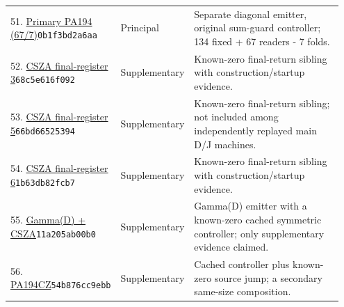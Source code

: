 \begin{longtable}{@{}p{0.27\linewidth}p{0.13\linewidth}p{0.55\linewidth}@{}}
51. \href{https://github.com/VladimirReshetnikov/ProveIt/blob/32d0d8b7d93a63ad4106c18cdb29b37927acdad2/Computability/BusyBeaver/Research/PA/docs/pa194_conpa_2026-11-13/construction/tables/pa194.tm}{Primary PA194 (67/7)}\newline\texttt{0b1f3bd2a6aa} & Principal & Separate diagonal emitter, original sum-guard controller; 134 fixed + 67 readers - 7 folds.\\[5pt]
52. \href{https://github.com/VladimirReshetnikov/ProveIt/blob/32d0d8b7d93a63ad4106c18cdb29b37927acdad2/Computability/BusyBeaver/Research/PA/docs/pa194j_pa194d_conpa_2026-11-13/research/sibling_tables/final_register_3/pa194CSZ_A3.tm}{CSZA final-register 3}\newline\texttt{68c5e616f092} & Supplementary & Known-zero final-return sibling with construction/startup evidence.\\[5pt]
53. \href{https://github.com/VladimirReshetnikov/ProveIt/blob/32d0d8b7d93a63ad4106c18cdb29b37927acdad2/Computability/BusyBeaver/Research/PA/docs/pa194j_pa194d_conpa_2026-11-13/research/sibling_tables/final_register_5/pa194CSZ_A5.tm}{CSZA final-register 5}\newline\texttt{66bd66525394} & Supplementary & Known-zero final-return sibling; not included among independently replayed main D/J machines.\\[5pt]
54. \href{https://github.com/VladimirReshetnikov/ProveIt/blob/32d0d8b7d93a63ad4106c18cdb29b37927acdad2/Computability/BusyBeaver/Research/PA/docs/pa194j_pa194d_conpa_2026-11-13/research/sibling_tables/final_register_6/pa194CSZ_A6.tm}{CSZA final-register 6}\newline\texttt{1b63db82fcb7} & Supplementary & Known-zero final-return sibling with construction/startup evidence.\\[5pt]
55. \href{https://github.com/VladimirReshetnikov/ProveIt/blob/32d0d8b7d93a63ad4106c18cdb29b37927acdad2/Computability/BusyBeaver/Research/PA/docs/pa194j_pa194d_conpa_2026-11-13/research/gamma_d_csza/candidate.tm}{Gamma(D) + CSZA}\newline\texttt{11a205ab00b0} & Supplementary & Gamma(D) emitter with a known-zero cached symmetric controller; only supplementary evidence claimed.\\[5pt]
56. \href{https://github.com/VladimirReshetnikov/ProveIt/blob/32d0d8b7d93a63ad4106c18cdb29b37927acdad2/Computability/BusyBeaver/Research/PA/docs/pa194c_conpa_2026-11-13_1/construction/tables/pa194cz.tm}{PA194CZ}\newline\texttt{54b876cc9ebb} & Supplementary & Cached controller plus known-zero source jump; a secondary same-size composition.\\[5pt]

\end{longtable}
